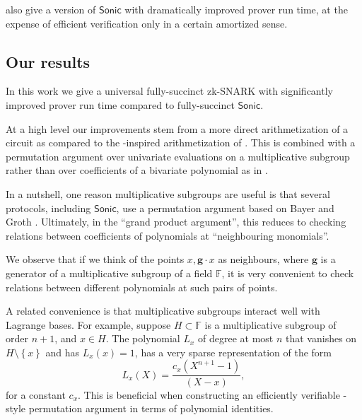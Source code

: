\documentclass[11pt]{article} %
\newcommand{\F}{\ensuremath{\mathbb F}\xspace}
\newcommand{\sonic}{\ensuremath{\mathsf{Sonic}}\xspace}
\newcommand{\set}[1]{\ensuremath{\left\{#1\right\}}\xspace}
\newcommand{\hgen}{\ensuremath{\mathbf{g}}\xspace}
\begin{document}
\cite{sonic} also give a version of \sonic with dramatically improved prover run time, at the expense of efficient verification only in a certain amortized sense.

\subsection{Our results}
In this work we give a universal fully-succinct zk-SNARK with significantly improved prover run time compared to fully-succinct \sonic.

At a high level our improvements stem from a more direct arithmetization of a circuit as compared to the \cite{Bootle}-inspired arithmetization of \cite{sonic}. This is combined with a permutation argument over univariate evaluations on a multiplicative subgroup rather than over coefficients of a bivariate polynomial as in \cite{sonic}.

In a nutshell, one reason multiplicative subgroups are useful is that several protocols, including \sonic,  use a permutation argument based on Bayer and Groth \cite{permorig}. Ultimately, in the ``grand product argument'', this reduces to checking relations between coefficients of polynomials at ``neighbouring monomials''.

We observe that if we think of the points $x,\hgen\cdot x$ as neighbours, where \hgen is a generator of a multiplicative subgroup of a field \F, it is very convenient to check relations between different polynomials at such pairs of points.

A related convenience is that multiplicative subgroups interact well with Lagrange bases.
For example, suppose  $H\subset \F$ is a multiplicative subgroup of order $n+1$, and $x\in H$.  The polynomial $L_x$ of degree at most $n$  that vanishes on $H\setminus\set{x}$ and has $L_x(x)=1$, has a very sparse representation of the form
\[L_x(X)= \frac{c_x(X^{n+1}-1)}{(X-x)},\]
for a constant $c_x$.
This is beneficial when constructing an efficiently verifiable \cite{permorig}-style permutation argument in terms of polynomial identities.
\end{document}
